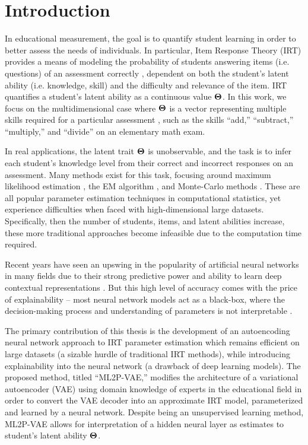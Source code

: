 \chapter{Introduction}

In educational measurement, the goal is to quantify student learning in order to better assess the needs of individuals. In particular, Item Response Theory (IRT) provides a means of modeling the probability of students answering items (i.e. questions) of an assessment correctly \cite{lord1968}, dependent on both the student's latent ability (i.e. knowledge, skill) and the difficulty and relevance of the item. IRT quantifies a student's latent ability as a continuous value $\boldsymbol{\Theta}$. In this work, we focus on the multidimensional case where $\boldsymbol{\Theta}$ is a vector representing multiple skills required for a particular assessment \cite{reckase2009multidimensional}, such as the skills ``add,'' ``subtract,'' ``multiply,'' and ``divide'' on an elementary math exam.

In real applications, the latent trait $\boldsymbol{\Theta}$ is unobservable, and the task is to infer each student's knowledge level from their correct and incorrect responses on an assessment. Many methods exist for this task, focusing around maximum likelihood estimation \cite{chen2019, baker_kim2004}, the EM algorithm \cite{bock1981, Feng2014}, and Monte-Carlo methods \cite{cai2010, patz1999}. These are all popular parameter estimation techniques in computational statistics, yet experience difficulties when faced with high-dimensional large datasets. Specifically, then the number of students, items, and latent abilities increase, these more traditional approaches become infeasible due to the computation time required. 

Recent years have seen an upswing in the popularity of artificial neural networks in many fields due to their strong predictive power and ability to learn deep contextual representations \cite{neural_net, vaswani2017}. But this high level of accuracy comes with the price of explainability -- most neural network models act as a black-box, where the decision-making process and understanding of parameters is not interpretable \cite{zhang2018interpretable}.

The primary contribution of this thesis is the development of an autoencoding neural network approach to IRT parameter estimation which remains efficient on large datasets (a sizable hurdle of traditional IRT methods), while introducing explainability into the neural network (a drawback of deep learning models). The proposed method, titled ``ML2P-VAE,'' modifies the architecture of a variational autoencoder (VAE) \cite{kingma2014} using domain knowledge of experts in the educational field \cite{daSilva2018, guo2017} in order to convert the VAE decoder into an approximate IRT model, parameterized and learned by a neural network. Despite being an unsupervised learning method, ML2P-VAE allows for interpretation of a hidden neural layer as estimates to student's latent ability $\boldsymbol{\Theta}$.


